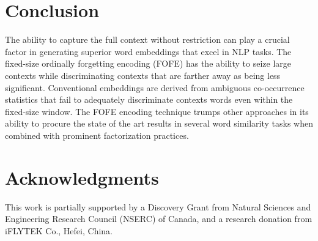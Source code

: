 \documentclass[11pt,letterpaper]{article}
\begin{document}
\section{Conclusion}

The ability to capture the full context without restriction can play a crucial factor in generating superior word embeddings that excel in NLP tasks. The fixed-size ordinally forgetting encoding (FOFE) has the ability to seize large contexts while discriminating contexts that are farther away as being less significant. 
Conventional embeddings are derived from ambiguous co-occurrence statistics that fail to adequately discriminate contexts words even within the fixed-size window. The FOFE encoding technique trumps other approaches in its ability to procure the state of the art results in several word similarity tasks when combined with prominent factorization practices.

\section*{Acknowledgments}

This work is partially supported by a Discovery Grant from Natural Sciences and Engineering Research Council (NSERC) of Canada, and a research donation from iFLYTEK Co., Hefei, China.



\end{document}
